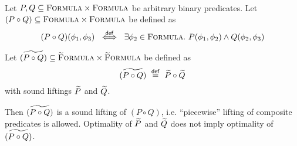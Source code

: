 \begin{lemma}~\\
    Let $P, Q \subseteq \textup{\textsc{Formula}} \times \textup{\textsc{Formula}}$ be arbitrary binary predicates.
    Let $(P \circ Q) \subseteq \textup{\textsc{Formula}} \times \textup{\textsc{Formula}}$ be defined as
    \begin{displaymath}
    (P \circ Q)(\phi_1, \phi_3) ~\overset{\textup{\textmd{\textsf{def}}}}{\iff}~ \exists \phi_2 \in \textup{\textsc{Formula}}.~ P(\phi_1, \phi_2) \wedge Q(\phi_2, \phi_3)
    \end{displaymath}
    
    Let $\widetilde{(P \circ Q)} \subseteq \textup{\textsc{\ensuremath{\widetilde{\text{F}}}ormula}} \times \textup{\textsc{\ensuremath{\widetilde{\text{F}}}ormula}}$ be defined as
    \begin{displaymath}
    \widetilde{(P \circ Q)} ~\overset{\textup{\textmd{\textsf{def}}}}{=}~ \widetilde{P} \circ \widetilde{Q}
    \end{displaymath}
    with sound liftings $\widetilde{P}$ and $\widetilde{Q}$.
    
    Then $\widetilde{(P \circ Q)}$ is a sound lifting of $(P \circ Q)$, i.e. “piecewise” lifting of composite predicates is allowed.
    Optimality of $\widetilde{P}$ and $\widetilde{Q}$ does not imply optimality of $\widetilde{(P \circ Q)}$.
\end{lemma}
